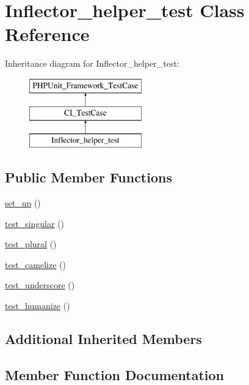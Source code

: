 \hypertarget{class_inflector__helper__test}{}\section{Inflector\+\_\+helper\+\_\+test Class Reference}
\label{class_inflector__helper__test}
Inheritance diagram for Inflector\+\_\+helper\+\_\+test\+:\begin{figure}[H]
\begin{center}
\leavevmode
\includegraphics[height=3.000000cm]{class_inflector__helper__test}
\end{center}
\end{figure}
\subsection*{Public Member Functions}
\begin{DoxyCompactItemize}
\item 
\hyperlink{class_inflector__helper__test_a69829875c8d4b6ce94908445c4155741}{set\+\_\+up} ()
\item 
\hyperlink{class_inflector__helper__test_ab755fc34010c179984e98ccd331d5326}{test\+\_\+singular} ()
\item 
\hyperlink{class_inflector__helper__test_ab03ca3debb9ebf048e8723e9296db7f2}{test\+\_\+plural} ()
\item 
\hyperlink{class_inflector__helper__test_a557715ce83a3d4b950c1d6bdcfa2c7c5}{test\+\_\+camelize} ()
\item 
\hyperlink{class_inflector__helper__test_a94301ad516898d51cc074c0e24e9a933}{test\+\_\+underscore} ()
\item 
\hyperlink{class_inflector__helper__test_a754ae2d775c82c174f6f047dbeea001f}{test\+\_\+humanize} ()
\end{DoxyCompactItemize}
\subsection*{Additional Inherited Members}


\subsection{Member Function Documentation}
\hypertarget{class_inflector__helper__test_a69829875c8d4b6ce94908445c4155741}{}
